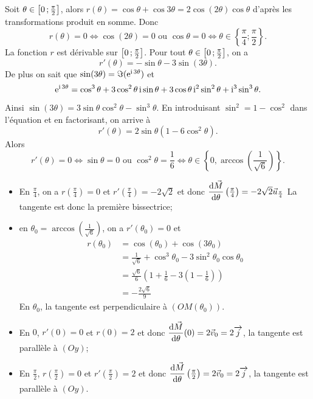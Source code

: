 Soit \(\theta \in \left[ 0 \, ;  \frac{\pi}{2} \right]\), alors \(r(\theta)=\cos \theta + \cos 3\theta=2\cos(2\theta)\cos \theta\) d'après les transformations produit en somme. Donc
\begin{equation}
  r(\theta)=0 \iff \cos(2\theta)=0 \text{~ou~} \cos \theta=0 \iff \theta \in \left\{\frac{\pi}{4}; \frac{\pi}{2}\right\}.
\end{equation}
La fonction \(r\) est dérivable sur \(\left[ 0 \, ;  \frac{\pi}{2} \right]\). Pour tout \(\theta \in \left[ 0 \, ;  \frac{\pi}{2} \right]\), on a
\begin{equation}
 r'(\theta)=-\sin\theta - 3 \sin(3 \theta).
\end{equation}
De plus on sait que \(\sin(3 \theta) = \Im(\operatorname{e}^{\operatorname{i} 3\theta})\) et
\begin{equation}
 \operatorname{e}^{\operatorname{i} 3 \theta}=\cos^3 \theta + 3\cos^2 \theta \operatorname{i} \sin \theta + 3 \cos \theta \operatorname{i}^2 \sin^2 \theta + \operatorname{i}^3\sin^3 \theta.
\end{equation}
 Ainsi \(\sin(3 \theta) = 3 \sin\theta \cos^2 \theta - \sin^3 \theta\). En introduisant \(\sin^2=1-\cos^2\) dans l'équation et en factorisant, on arrive à
 \begin{equation}
  r'(\theta)=2 \sin \theta (1-6 \cos^2 \theta).
 \end{equation}
Alors
\begin{equation}
 r'(\theta)=0 \iff \sin\theta=0 \text{~ou~} \cos^2 \theta = \frac{1}{6} \iff \theta \in \left\{0, \arccos\left(\frac{1}{\sqrt{6}}\right)\right\}.
\end{equation}
\begin{itemize}
\item En \(\frac{\pi}{4}\), on a \(r\left(\frac{\pi}{4}\right)=0\) et \(r'\left(\frac{\pi}{4}\right)=-2\sqrt{2}\) et donc \(\dfrac{\mathrm{d} \vec{M}}{\mathrm{d} \theta}\left(\frac{\pi}{4}\right) = -2\sqrt{2}\vec{u}_{\frac{\pi}{4}}\) La tangente est donc la première bissectrice;
\item en \(\theta_0=\arccos\left(\frac{1}{\sqrt{6}}\right)\), on a \(r'(\theta_0)=0\) et
 \begin{align}
  r(\theta_0) & = \cos(\theta_0) + \cos(3 \theta_0) \\
  & = \frac{1}{\sqrt{6}} + \cos^3\theta_0 - 3 \sin^2\theta_0 \cos\theta_0 \\
  & = \frac{\sqrt{6}}{6} \left(1+\frac{1}{6}-3\left(1-\frac{1}{6}\right)\right) \\
  & = -\frac{2\sqrt{6}}{9}
 \end{align}
En \(\theta_0\), la tangente est perpendiculaire à \((OM(\theta_0))\).
\end{itemize}
\begin{itemize}
\item En \(0\), \(r'(0)=0\) et \(r(0)=2\) et donc \(\dfrac{\mathrm{d} \vec{M}}{\mathrm{d} \theta}(0)=2 \vec{v}_0=2 \overrightarrow{j}\), la tangente est parallèle à \((Oy)\);
\item En \(\frac{\pi}{2}\), \(r\left(\frac{\pi}{2}\right)=0\) et \(r'\left(\frac{\pi}{2}\right)=2\) et donc \(\dfrac{\mathrm{d} \vec{M}}{\mathrm{d} \theta}\left(\frac{\pi}{2}\right)=2 \vec{v}_0=2 \overrightarrow{j}\), la tangente est parallèle à \((Oy)\).
\end{itemize}

